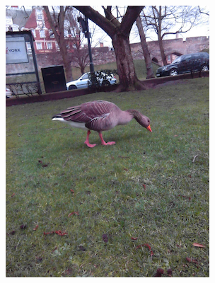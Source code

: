 \documentclass{l4proj}
\begin{document}
\begin{figure}[ht]
\begin{subfigure}[h!]{0.18\textwidth}
    \includegraphics[width=\textwidth, trim={0cm 1.6cm 0cm 1.6cm}, clip]{images/dataset/goose/rgb.png}

\end{subfigure}
\end{figure}
\end{document}
